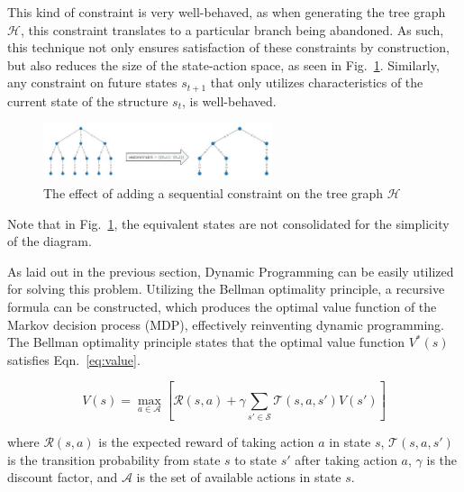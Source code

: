 \documentclass{article}
\begin{document}
This kind of constraint is very well-behaved, as when generating the tree graph $\mathcal{H}$, this constraint translates to a particular branch being abandoned. As such, this technique not only ensures satisfaction of these constraints by construction, but also reduces the size of the state-action space, as seen in Fig.~\ref{fig:cnstrnt}. Similarly, any constraint on future states $s_{t+1}$ that only utilizes characteristics of the current state of the structure $s_t$, is well-behaved.

\begin{figure}[!htb]
    \centering
    \includegraphics[width=0.6\textwidth]{figs/Constraint.jpg}
      \caption{The effect of adding a sequential constraint on the tree graph $\mathcal{H}$}
      \label{fig:cnstrnt}
\end{figure}

Note that in Fig.~\ref{fig:cnstrnt}, the equivalent states are not consolidated for the simplicity of the diagram.

As laid out in the previous section, Dynamic Programming can be easily utilized for solving this problem. Utilizing the Bellman optimality principle, a recursive formula can be constructed, which produces the optimal value function of the Markov decision process (MDP), effectively reinventing dynamic programming. The Bellman optimality principle states that the optimal value function $V^*(s)$ satisfies Eqn.~\ref{eq:value}.

\begin{equation} \label{eq:value}
    V(s) = \max_{a \in \mathcal{A}} \left[\mathcal{R}(s,a) + \gamma \sum_{s' \in \mathcal{S}} \mathcal{T}(s,a,s') V(s')\right]    
\end{equation}

where $\mathcal{R}(s,a)$ is the expected reward of taking action $a$ in state $s$, $\mathcal{T}(s,a,s')$ is the transition probability from state $s$ to state $s'$ after taking action $a$, $\gamma$ is the discount factor, and $\mathcal{A}$ is the set of available actions in state $s$.
\end{document}
